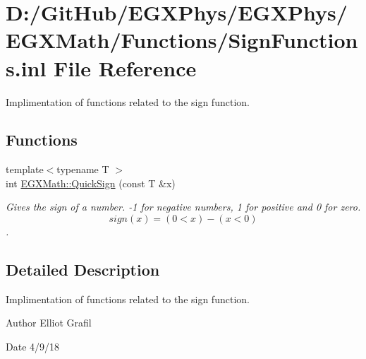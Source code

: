 \hypertarget{_sign_functions_8inl}{}\section{D\+:/\+Git\+Hub/\+E\+G\+X\+Phys/\+E\+G\+X\+Phys/\+E\+G\+X\+Math/\+Functions/\+Sign\+Functions.inl File Reference}
\label{_sign_functions_8inl}


Implimentation of functions related to the sign function.  


\subsection*{Functions}
\begin{DoxyCompactItemize}
\item 
{\footnotesize template$<$typename T $>$ }\\int \mbox{\hyperlink{group___e_g_x_math-_functions-_sign_ga54232a5bc24caf3833c30c15def764bf}{E\+G\+X\+Math\+::\+Quick\+Sign}} (const T \&x)
\begin{DoxyCompactList}\small\item\em Gives the sign of a number. -\/1 for negative numbers, 1 for positive and 0 for zero. \[sign(x)=(0 < x) - (x < 0) \]. \end{DoxyCompactList}\end{DoxyCompactItemize}


\subsection{Detailed Description}
Implimentation of functions related to the sign function. 

\begin{DoxyAuthor}{Author}
Elliot Grafil 
\end{DoxyAuthor}
\begin{DoxyDate}{Date}
4/9/18 
\end{DoxyDate}
